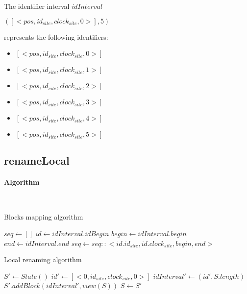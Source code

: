 \documentclass[a4paper]{article}
\begin{document}
The identifier interval $idInterval$
\begin{center}
  $([<pos, id_{site}, clock_{site}, 0>], 5)$
\end{center}
represents the following identifiers:
\begin{itemize}
  \item $[<pos, id_{site}, clock_{site}, 0>]$
  \item $[<pos, id_{site}, clock_{site}, 1>]$
  \item $[<pos, id_{site}, clock_{site}, 2>]$
  \item $[<pos, id_{site}, clock_{site}, 3>]$
  \item $[<pos, id_{site}, clock_{site}, 4>]$
  \item $[<pos, id_{site}, clock_{site}, 5>]$
\end{itemize}

\subsection{renameLocal}

\paragraph{Algorithm}~\\

\begin{algorithm}
  \caption{Blocks mapping algorithm}
  \label{alg:block-mapping}
  \begin{algorithmic}
      \State $seq \gets []$
        \State $id \gets idInterval.idBegin$
        \State $begin \gets idInterval.begin$
        \State $end \gets idInterval.end$
        \State $seq \gets seq :: <id.id_{site}, id.clock_{site}, begin, end>$
      \EndFor
    \EndFunction
  \end{algorithmic}
\end{algorithm}

\begin{algorithm}
  \caption{Local renaming algorithm}
  \label{alg:rename-local-block}
  \begin{algorithmic}
      \State $S' \gets State()$
      \State $id' \gets [<0, id_{site}, clock_{site}, 0>]$
      \State $idInterval' \gets (id', S.length)$
      \State $S'.addBlock(idInterval', view(S))$
      \State $S \gets S'$
    \EndProcedure
  \end{algorithmic}
\end{algorithm}
\end{document}
